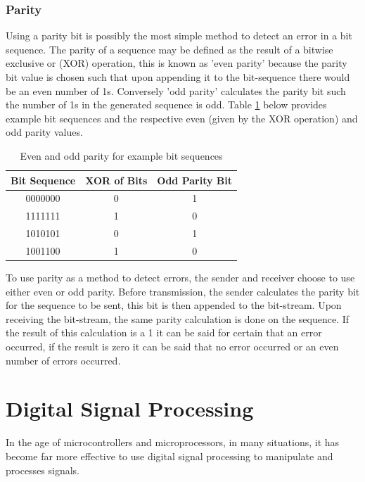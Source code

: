 \subsubsection{Parity}
Using a parity bit is possibly the most simple method to detect an error in a bit sequence. The parity of a sequence may be defined as the result of a bitwise exclusive or (XOR) operation, this is known as 'even parity' because the parity bit value is chosen such that upon appending it to the bit-sequence there would be an even number of 1s. Conversely 'odd parity' calculates the parity bit such the number of 1s in the generated sequence is odd. Table \ref{tbl:party_examples} below provides example bit sequences and the respective even (given by the XOR operation) and odd parity values.

\begin{table}[H]
	\centering
	\begin{tabular}{ccc}
		\hline
		\multicolumn{1}{l}{\textbf{Bit Sequence}} & \textbf{XOR of Bits} & \multicolumn{1}{l}{\textbf{Odd Parity Bit}} \\ \hline
		0000000 & 0 & 1 \\ \hline
		1111111 & 1 & 0 \\ \hline
		1010101 & 0 & 1 \\ \hline
		1001100 & 1 & 0 \\ \hline
	\end{tabular}
	\caption{Even and odd parity for example bit sequences}
	\label{tbl:party_examples}
\end{table}

To use parity as a method to detect errors, the sender and receiver choose to use either even or odd parity. Before transmission, the sender calculates the parity bit for the sequence to be sent, this bit is then appended to the bit-stream. Upon receiving the bit-stream, the same parity calculation is done on the sequence. If the result of this calculation is a 1 it can be said for certain that an error occurred, if the result is zero it can be said that no error occurred or an even number of errors occurred.






\section{Digital Signal Processing}
In the age of microcontrollers and microprocessors, in many situations, it has become far more effective to use digital signal processing to manipulate and processes signals.

